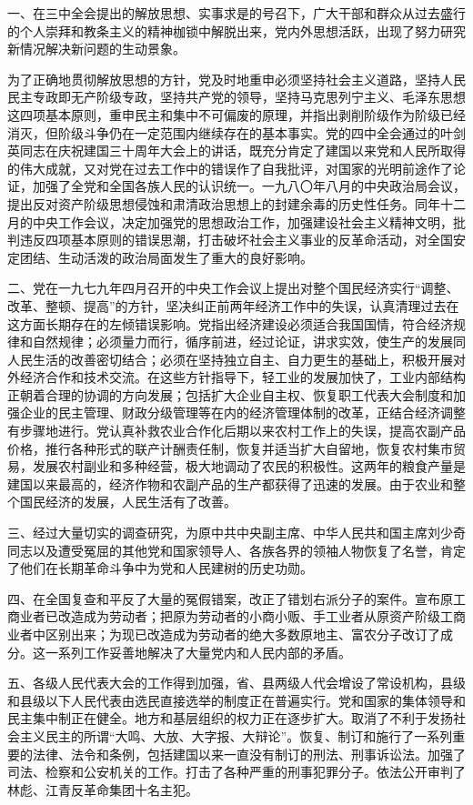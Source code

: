 一、在三中全会提出的解放思想、实事求是的号召下，广大干部和群众从过去盛行的个人崇拜和教条主义的精神枷锁中解脱出来，党内外思想活跃，出现了努力研究新情况解决新问题的生动景象。

为了正确地贯彻解放思想的方针，党及时地重申必须坚持社会主义道路，坚持人民民主专政即无产阶级专政，坚持共产党的领导，坚持马克思列宁主义、毛泽东思想这四项基本原则，重申民主和集中不可偏废的原理，并指出剥削阶级作为阶级已经消灭，但阶级斗争仍在一定范围内继续存在的基本事实。党的四中全会通过的叶剑英同志在庆祝建国三十周年大会上的讲话，既充分肯定了建国以来党和人民所取得的伟大成就，又对党在过去工作中的错误作了自我批评，对国家的光明前途作了论证，加强了全党和全国各族人民的认识统一。一九八〇年八月的中央政治局会议，提出反对资产阶级思想侵蚀和肃清政治思想上的封建余毒的历史性任务。同年十二月的中央工作会议，决定加强党的思想政治工作，加强建设社会主义精神文明，批判违反四项基本原则的错误思潮，打击破坏社会主义事业的反革命活动，对全国安定团结、生动活泼的政治局面发生了重大的良好影响。

二、党在一九七九年四月召开的中央工作会议上提出对整个国民经济实行“调整、改革、整顿、提高”的方针，坚决纠正前两年经济工作中的失误，认真清理过去在这方面长期存在的左倾错误影响。党指出经济建设必须适合我国国情，符合经济规律和自然规律；必须量力而行，循序前进，经过论证，讲求实效，使生产的发展同人民生活的改善密切结合；必须在坚持独立自主、自力更生的基础上，积极开展对外经济合作和技术交流。在这些方针指导下，轻工业的发展加快了，工业内部结构正朝着合理的协调的方向发展；包括扩大企业自主权、恢复职工代表大会制度和加强企业的民主管理、财政分级管理等在内的经济管理体制的改革，正结合经济调整有步骤地进行。党认真补救农业合作化后期以来农村工作上的失误，提高农副产品价格，推行各种形式的联产计酬责任制，恢复并适当扩大自留地，恢复农村集市贸易，发展农村副业和多种经营，极大地调动了农民的积极性。这两年的粮食产量是建国以来最高的，经济作物和农副产品的生产都获得了迅速的发展。由于农业和整个国民经济的发展，人民生活有了改善。

三、经过大量切实的调查研究，为原中共中央副主席、中华人民共和国主席刘少奇同志以及遭受冤屈的其他党和国家领导人、各族各界的领袖人物恢复了名誉，肯定了他们在长期革命斗争中为党和人民建树的历史功勋。

四、在全国复查和平反了大量的冤假错案，改正了错划右派分子的案件。宣布原工商业者已改造成为劳动者；把原为劳动者的小商小贩、手工业者从原资产阶级工商业者中区别出来；为现已改造成为劳动者的绝大多数原地主、富农分子改订了成分。这一系列工作妥善地解决了大量党内和人民内部的矛盾。

五、各级人民代表大会的工作得到加强，省、县两级人代会增设了常设机构，县级和县级以下人民代表由选民直接选举的制度正在普遍实行。党和国家的集体领导和民主集中制正在健全。地方和基层组织的权力正在逐步扩大。取消了不利于发扬社会主义民主的所谓“大鸣、大放、大字报、大辩论”。恢复、制订和施行了一系列重要的法律、法令和条例，包括建国以来一直没有制订的刑法、刑事诉讼法。加强了司法、检察和公安机关的工作。打击了各种严重的刑事犯罪分子。依法公开审判了林彪、江青反革命集团十名主犯。

